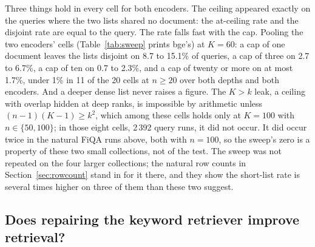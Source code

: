 \documentclass[11pt]{article}
\begin{document}
Three things hold in every cell for both encoders. The ceiling appeared exactly on the queries where the two lists shared no document: the at-ceiling rate and the disjoint rate are equal to the query. The rate falls fast with the cap. Pooling the two encoders' cells (Table~\ref{tab:sweep} prints bge's) at $K = 60$: a cap of one document leaves the lists disjoint on 8.7 to 15.1\% of queries, a cap of three on 2.7 to 6.7\%, a cap of ten on 0.7 to 2.3\%, and a cap of twenty or more on at most 1.7\%, under 1\% in 11 of the 20 cells at $n \ge 20$ over both depths and both encoders. And a deeper dense list never raises a figure. The $K > k$ leak, a ceiling with overlap hidden at deep ranks, is impossible by arithmetic unless $(n-1)(K-1) \ge k^2$, which among these cells holds only at $K = 100$ with $n \in \{50, 100\}$; in those eight cells, 2\,392 query runs, it did not occur. It did occur twice in the natural FiQA runs above, both with $n = 100$, so the sweep's zero is a property of these two small collections, not of the test. The sweep was not repeated on the four larger collections; the natural row counts in Section~\ref{sec:rowcount} stand in for it there, and they show the short-list rate is several times higher on three of them than these two suggest.

\subsection{Does repairing the keyword retriever improve retrieval?}
\label{sec:effect}
\end{document}

